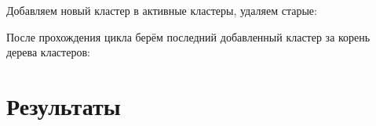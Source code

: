 \documentclass[11pt]{article}
\begin{document}
	Добавляем новый кластер в активные кластеры, удаляем старые:
	

	После прохождения цикла берём последний добавленный кластер за корень дерева кластеров:
	


    \section{Результаты}\label{section:results}
	
	\pagebreak

	
	
	
\end{document}
